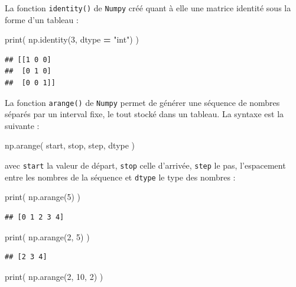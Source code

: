\documentclass[12pt,]{book}
\newenvironment{Shaded}{\begin{snugshade}}{\end{snugshade}}
\newcommand{\DecValTok}[1]{\textcolor[rgb]{0.00,0.00,0.81}{#1}}
\newcommand{\StringTok}[1]{\textcolor[rgb]{0.31,0.60,0.02}{#1}}
\newcommand{\OperatorTok}[1]{\textcolor[rgb]{0.81,0.36,0.00}{\textbf{#1}}}
\newcommand{\BuiltInTok}[1]{#1}
\newcommand{\NormalTok}[1]{#1}
\numberwithin{equation}{section}
\numberwithin{countremarque}{section}
\begin{document}
La fonction \texttt{identity()} de \texttt{Numpy} créé quant à elle une
matrice identité sous la forme d'un tableau :

\begin{Shaded}
\begin{Highlighting}[]
\BuiltInTok{print}\NormalTok{( np.identity(}\DecValTok{3}\NormalTok{, dtype }\OperatorTok{=} \StringTok{"int"}\NormalTok{) )}
\end{Highlighting}
\end{Shaded}

\begin{lstlisting}
## [[1 0 0]
##  [0 1 0]
##  [0 0 1]]
\end{lstlisting}

La fonction \texttt{arange()} de \texttt{Numpy} permet de générer une
séquence de nombres séparés par un interval fixe, le tout stocké dans un
tableau. La syntaxe est la suivante :

\begin{Shaded}
\begin{Highlighting}[]
\NormalTok{np.arange( start, stop, step, dtype )}
\end{Highlighting}
\end{Shaded}

avec \texttt{start} la valeur de départ, \texttt{stop} celle d'arrivée,
\texttt{step} le pas, l'espacement entre les nombres de la séquence et
\texttt{dtype} le type des nombres :

\begin{Shaded}
\begin{Highlighting}[]
\BuiltInTok{print}\NormalTok{( np.arange(}\DecValTok{5}\NormalTok{) )}
\end{Highlighting}
\end{Shaded}

\begin{lstlisting}
## [0 1 2 3 4]
\end{lstlisting}

\begin{Shaded}
\begin{Highlighting}[]
\BuiltInTok{print}\NormalTok{( np.arange(}\DecValTok{2}\NormalTok{, }\DecValTok{5}\NormalTok{) )}
\end{Highlighting}
\end{Shaded}

\begin{lstlisting}
## [2 3 4]
\end{lstlisting}

\begin{Shaded}
\begin{Highlighting}[]
\BuiltInTok{print}\NormalTok{( np.arange(}\DecValTok{2}\NormalTok{, }\DecValTok{10}\NormalTok{, }\DecValTok{2}\NormalTok{) )}
\end{Highlighting}
\end{Shaded}
\end{document}
